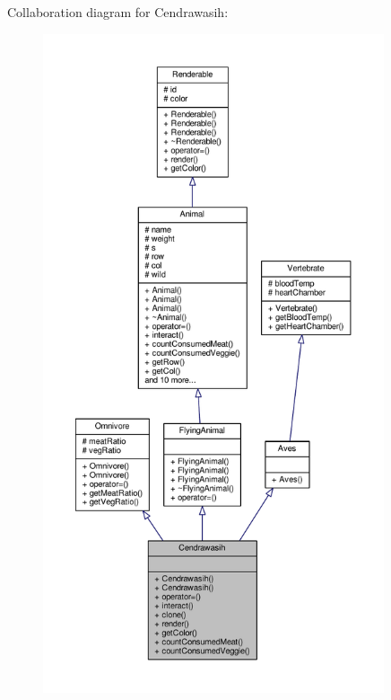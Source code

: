 Collaboration diagram for Cendrawasih\+:
\nopagebreak
\begin{figure}[H]
\begin{center}
\leavevmode
\includegraphics[height=550pt]{classCendrawasih__coll__graph}
\end{center}
\end{figure}

